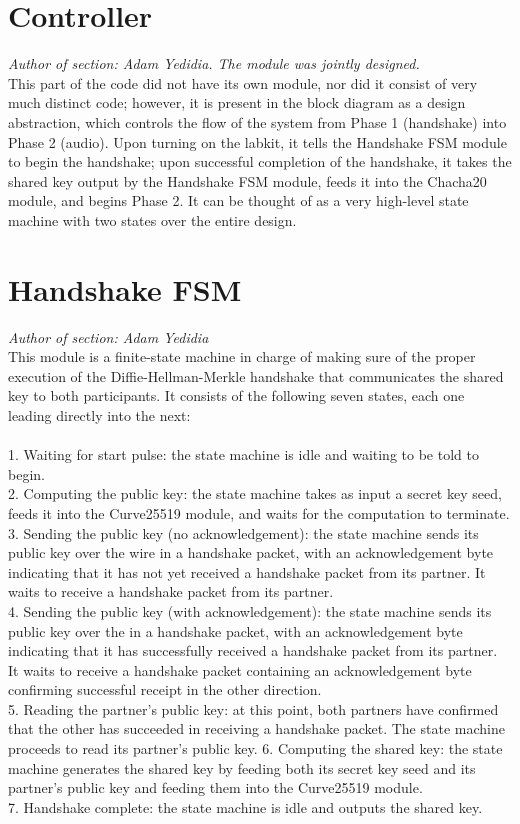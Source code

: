\documentclass[a4paper]{report}
\begin{document}
\section{Controller}

\emph{Author of section: Adam Yedidia. The module was jointly designed.} \\

This part of the code did not have its own module, nor did it consist of very much distinct code; however, it is present in the block diagram as a design abstraction, which controls the flow of the system from Phase 1 (handshake) into Phase 2 (audio). Upon turning on the labkit, it tells the Handshake FSM module to begin the handshake; upon successful completion of the handshake, it takes the shared key output by the Handshake FSM module, feeds it into the Chacha20 module, and begins Phase 2. It can be thought of as a very high-level state machine with two states over the entire design.

\section{Handshake FSM}

\emph{Author of section: Adam Yedidia} \\

This module is a finite-state machine in charge of making sure of the proper execution of the Diffie-Hellman-Merkle handshake that communicates the shared key to both participants. It consists of the following seven states, each one leading directly into the next: \\ \\
1. Waiting for start pulse: the state machine is idle and waiting to be told to begin. \\
2. Computing the public key: the state machine takes as input a secret key seed, feeds it into the Curve25519 module, and waits for the computation to terminate. \\
3. Sending the public key (no acknowledgement): the state machine sends its public key over the wire in a handshake packet, with an acknowledgement byte indicating that it has not yet received a handshake packet from its partner. It waits to receive a handshake packet from its partner. \\
4. Sending the public key (with acknowledgement): the state machine sends its public key over the in a handshake packet, with an acknowledgement byte indicating that it has successfully received a handshake packet from its partner. It waits to receive a handshake packet containing an acknowledgement byte confirming successful receipt in the other direction. \\
5. Reading the partner's public key: at this point, both partners have confirmed that the other has succeeded in receiving a handshake packet. The state machine proceeds to read its partner's public key. 
6. Computing the shared key: the state machine generates the shared key by feeding both its secret key seed and its partner's public key and feeding them into the Curve25519 module. \\
7. Handshake complete: the state machine is idle and outputs the shared key. \\
\end{document}
